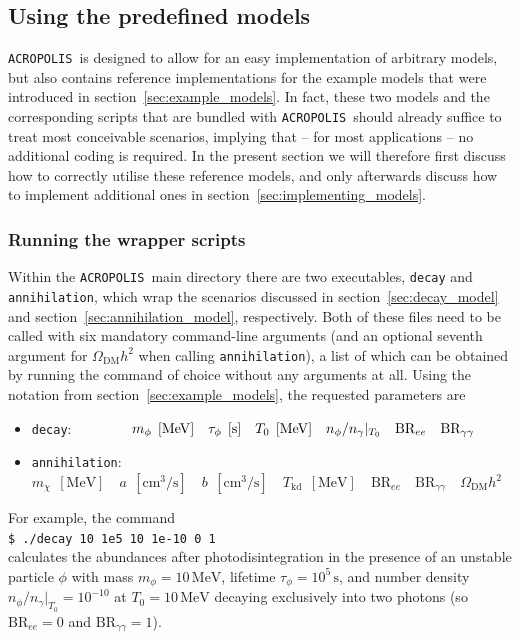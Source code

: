 \documentclass[11pt,a4paper]{article}
\newcommand{\cmd}[1]{\vspace{0.3cm}\texttt{\$ #1}\\[0.3cm]}
\newcommand{\acropolis}{\texttt{ACROPOLIS}~}
\begin{document}
\subsection{Using the predefined models}
\acropolis is designed to allow for an easy implementation of arbitrary models, but also contains reference implementations for the example models that were introduced in section~\ref{sec:example_models}. In fact, these two models and the corresponding scripts that are bundled with \acropolis should already suffice to treat most conceivable scenarios, implying that -- for most applications -- no additional coding is required. In the present section we will therefore first discuss how to correctly utilise these reference models, and only afterwards discuss how to implement additional ones in section~\ref{sec:implementing_models}.

\subsubsection{Running the wrapper scripts}
\label{sec:wrappers}
Within the \acropolis main directory there are two executables, \texttt{decay} and \texttt{annihilation}, which wrap the scenarios discussed in section~\ref{sec:decay_model} and section~\ref{sec:annihilation_model}, respectively. Both of these files need to be called with six mandatory command-line arguments (and an optional seventh argument for $\Omega_\text{DM} h^2$ when calling \texttt{annihilation}), a list of which can be obtained by running the command of choice without any arguments at all. Using the notation from section~\ref{sec:example_models}, the requested parameters are
\begin{itemize}
	\item \texttt{decay}: $\hspace{1.4cm} m_\phi\;\,[\mathrm{MeV}] \quad \tau_\phi\;\,[\mathrm{s}] \quad T_0\;\,[\mathrm{MeV}] \quad n_\phi/n_\gamma|_{T_0} \quad \text{BR}_{ee} \quad \text{BR}_{\gamma\gamma}$
	\item \texttt{annihilation}: $ m_\chi\;\,[\mathrm{MeV}] \quad a\;\,[\mathrm{cm^3/s}] \quad b\;\,[\mathrm{cm^3/s}] \quad T_\text{kd}\;\,[\mathrm{MeV}] \quad \text{BR}_{ee} \quad \text{BR}_{\gamma\gamma} \quad \Omega_\text{DM} h^2$
\end{itemize}
For example, the command\\[4mm]
\cmd{./decay 10 1e5 10 1e-10 0 1}
calculates the abundances after photodisintegration in the presence of an unstable particle $\phi$ with mass $m_\phi=10\,\mathrm{MeV}$, lifetime $\tau_\phi=10^5\,\mathrm{s}$, and number density $ n_\phi/n_\gamma|_{T_0} = 10^{-10}$ at $T_0=10\,\mathrm{MeV}$ decaying exclusively into two photons (so $\text{BR}_{ee} = 0$ and $\text{BR}_{\gamma\gamma}=1$).
\end{document}
